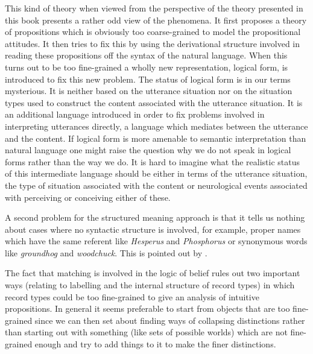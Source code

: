 This kind of theory when viewed from the
perspective of the theory presented in this book presents a rather odd
view of the phenomena.  It first proposes a theory of propositions
which is obviously too coarse-grained to model the
propositional attitudes.  It then tries to fix this by using the
derivational structure involved in reading these propositions off the
syntax of the natural language.  When this turns out to be too fine-grained a wholly new representation, logical form, is introduced to fix this new
problem.  The status of logical form is in our terms mysterious.  It
is neither based on the utterance situation nor on the situation types
used to construct the content associated with the utterance
situation.  It is an additional language introduced in
order to fix problems involved in interpreting utterances directly,
a language which mediates between the utterance and the content.  If
logical form is more amenable to semantic interpretation than natural
language one might raise the question why we do not speak in logical
forms rather than the way we do.
It is hard to imagine what the realistic status of this intermediate language
should be either in terms of the utterance situation, the type of
situation associated with the content or neurological events
associated with perceiving or conceiving either of these.  



A second problem for the structured meaning approach is that it tells
us nothing about cases where no syntactic structure is involved, for
example, proper names which have the same referent like
\textit{Hesperus} and \textit{Phosphorus} or synonymous words like
\textit{groundhog} and \textit{woodchuck}.  This is pointed out by \cite{DowtyWallPeters1981}.

   

The fact that matching is involved in the logic of belief rules out two
important ways (relating to labelling and the internal structure of
record types) in which record types could be too fine-grained to give
an analysis of intuitive propositions.  In general it seems preferable to
start from objects that are too fine-grained since we can then set
about finding ways of collapsing distinctions rather than starting out
with something (like sets of possible worlds) which are not
fine-grained enough and try to add things to it to make the finer
distinctions.  

